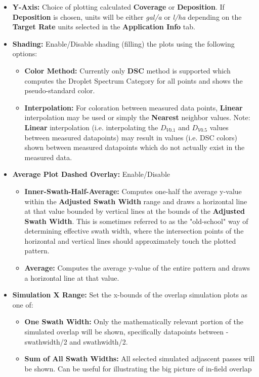 \documentclass[10pt,letterpaper,titlepage]{article}
\begin{document}
    \begin{itemize}
        \item \textbf{Y-Axis:} Choice of plotting calculated \textbf{Coverage} or \textbf{Deposition}. If \textbf{Deposition} is chosen, units will be either \textit{gal/a} or \textit{l/ha} depending on the \textbf{Target Rate} units selected in the \textbf{Application Info} tab.
        \item \textbf{Shading:} Enable/Disable shading (filling) the plots using the following options:
        \begin{itemize}
            \item \textbf{Color Method:} Currently only \textbf{DSC} method is supported which computes the Droplet Spectrum Category for all points and shows the pseudo-standard color.
            \item \textbf{Interpolation:} For coloration between measured data points, \textbf{Linear} interpolation may be used or simply the \textbf{Nearest} neighbor values. \color{red}Note: \textbf{Linear} interpolation (i.e. interpolating the $D_{V0.1}$ and $D_{V0.5}$ values between measured datapoints) may result in values (i.e. DSC colors) shown between measured datapoints which do not actually exist in the measured data.\color{black}
        \end{itemize}
        \item \textbf{Average Plot Dashed Overlay:} Enable/Disable
        \begin{itemize}
            \item \textbf{Inner-Swath-Half-Average:} Computes one-half the average y-value within the \textbf{Adjusted Swath Width} range and draws a horizontal line at that value bounded by vertical lines at the bounds of the \textbf{Adjusted Swath Width}. This is sometimes referred to as the "old-school" way of determining effective swath width, where the intersection points of the horizontal and vertical lines should approximately touch the plotted pattern.
            \item \textbf{Average:} Computes the average y-value of the entire pattern and draws a horizontal line at that value.
        \end{itemize}
        \item \textbf{Simulation X Range:} Set the x-bounds of the overlap simulation plots as one of:
        \begin{itemize}
            \item \textbf{One Swath Width:} Only the mathematically relevant portion of the simulated overlap will be shown, specifically datapoints between -swathwidth/2 and swathwidth/2.
            \item \textbf{Sum of All Swath Widths:} All selected simulated adjascent passes will be shown. Can be useful for illustrating the big picture of in-field overlap
        \end{itemize}
    \end{itemize}
\end{document}
